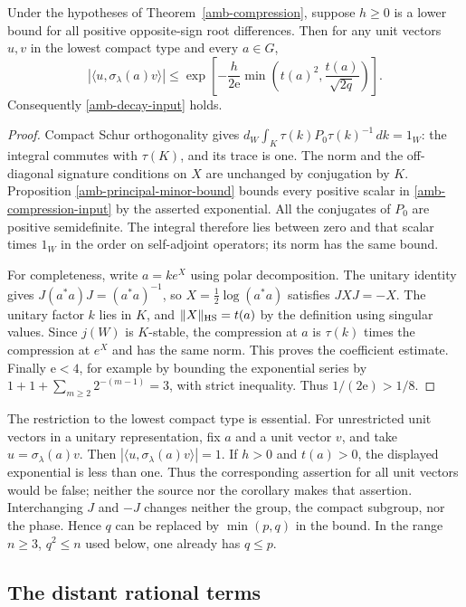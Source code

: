 \begin{corollary}\label{amb-decay-from-compression}
Under the hypotheses of Theorem~\ref{amb-compression},
suppose $h\ge0$ is a lower bound for all positive
opposite-sign root differences. Then for any unit
vectors $u,v$ in the lowest compact type and every $a\in G$,
\[
 |\langle u,\sigma_\lambda(a)v\rangle|
 \le\exp\left[-\frac{h}{2\mathrm e}
           \min\left(t(a)^2,\frac{t(a)}{\sqrt{2q}}\right)\right].
\]
Consequently \eqref{amb-decay-input} holds.
\end{corollary}
\begin{proof}
Compact Schur orthogonality gives
$d_W\int_K\tau(k)P_0\tau(k)^{-1}\,dk=1_W$:
the integral commutes with $\tau(K)$, and its trace is one.
The norm and the off-diagonal signature conditions on $X$
are unchanged by conjugation by $K$. Proposition
\ref{amb-principal-minor-bound} bounds every positive scalar
in \eqref{amb-compression-input} by the asserted exponential.
All the conjugates of $P_0$ are positive semidefinite.
The integral therefore lies between zero and that scalar
times $1_W$ in the order on self-adjoint operators; its norm
has the same bound.

For completeness, write $a=k e^X$ using polar decomposition.
The unitary identity gives
$J(a^*a)J=(a^*a)^{-1}$, so
$X=\frac12\log(a^*a)$ satisfies $JXJ=-X$.
The unitary factor $k$ lies in $K$, and
$\|X\|_{\rm HS}=t(a)$ by the definition using singular values.
Since $j(W)$ is $K$-stable, the compression at $a$ is
$\tau(k)$ times the compression at $e^X$ and has the same
norm. This proves the coefficient estimate.
Finally $\mathrm e<4$, for example by bounding the exponential
series by $1+1+\sum_{m\ge2}2^{-(m-1)}=3$, with strict
inequality. Thus $1/(2\mathrm e)>1/8$.
\end{proof}

The restriction to the lowest compact type is essential.
For unrestricted unit vectors in a unitary representation,
fix $a$ and a unit vector $v$, and take $u=\sigma_\lambda(a)v$.
Then $|\langle u,\sigma_\lambda(a)v\rangle|=1$.
If $h>0$ and $t(a)>0$, the displayed exponential is less
than one. Thus the corresponding assertion for all
unit vectors would be false; neither the source nor the
corollary makes that assertion.
Interchanging $J$ and $-J$ changes neither the group,
the compact subgroup, nor the phase. Hence $q$ can be
replaced by $\min(p,q)$ in the bound. In the range
$n\ge3$, $q^2\le n$ used below, one already has $q\le p$.

\subsection{The distant rational terms}

